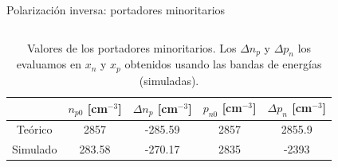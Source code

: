 \documentclass[aspectratio=169,xcolor=dvipsnames]{beamer}
\begin{document}
\begin{frame}{Polarización inversa: portadores minoritarios}
\begin{columns}
        \end{columns}
        \begin{table}
            \caption{Valores de los portadores minoritarios. Los $\Delta n_p$ y $\Delta p_n$ los evaluamos en $x_n$ y $x_p$ obtenidos usando las bandas de energías (simuladas).}
            \begin{tabular}{c|cccc}
                & $n_{p0} $ \tiny{[cm$^{-3}$]} & $\Delta n_p$ \tiny{[cm$^{-3}$]}  & $p_{n0} $  \tiny{[cm$^{-3}$]}  & $\Delta p_n$ \tiny{[cm$^{-3}$]}   \\ \hline
                Teórico & 2857 & -285.59  & 2857 & 2855.9 \\
                Simulado & 283.58 & -270.17 & 2835  & -2393 
            \end{tabular}
        \end{table}
\end{frame}
\end{document}
